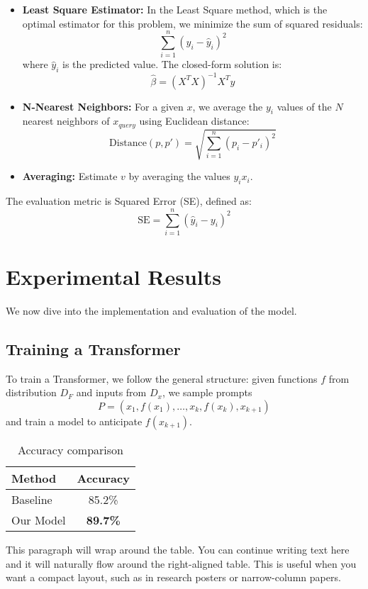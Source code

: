 \documentclass[11pt]{article}
\begin{document}
\begin{itemize}[leftmargin=2em]
    \item \textbf{Least Square Estimator:} In the Least Square method, which is the optimal estimator for this problem, we minimize the sum of squared residuals:
    \[
    \sum_{i=1}^{n}(y_i - \hat{y}_i)^2
    \]
    where $\hat{y}_i$ is the predicted value. The closed-form solution is:
    \[
    \hat{\beta} = (X^TX)^{-1}X^Ty
    \]

    \item \textbf{N-Nearest Neighbors:} For a given $x$, we average the $y_i$ values of the $N$ nearest neighbors of $x_{query}$ using Euclidean distance:
    \[
    \text{Distance}(p, p') = \sqrt{\sum_{i=1}^n (p_i - p'_i)^2}
    \]

    \item \textbf{Averaging:} Estimate $v$ by averaging the values $y_i x_i$.
\end{itemize}

The evaluation metric is Squared Error (SE), defined as:
\[
\text{SE} = \sum_{i=1}^n (\hat{y}_i - y_i)^2
\]

\section{Experimental Results}

We now dive into the implementation and evaluation of the model.

\subsection{Training a Transformer}

To train a Transformer, we follow the general structure: given functions $f$ from distribution $D_F$ and inputs from $D_x$, we sample prompts
\[
P = (x_1, f(x_1), \ldots, x_k, f(x_k), x_{k+1})
\]
and train a model to anticipate $f(x_{k+1})$.

\begin{wraptable}{l}{0.5\textwidth}
    \centering
    \begin{tabular}{|l|c|}
      \hline
      \textbf{Method} & \textbf{Accuracy} \\
      \hline
      Baseline        & 85.2\% \\
      Our Model       & \textbf{89.7\%} \\
      \hline
    \end{tabular}
    \caption{Accuracy comparison}
    \label{tab:wraptable}
  \end{wraptable}
  
  This paragraph will wrap around the table. You can continue writing text here and it will naturally flow around the right-aligned table. This is useful when you want a compact layout, such as in research posters or narrow-column papers.
\end{document}
